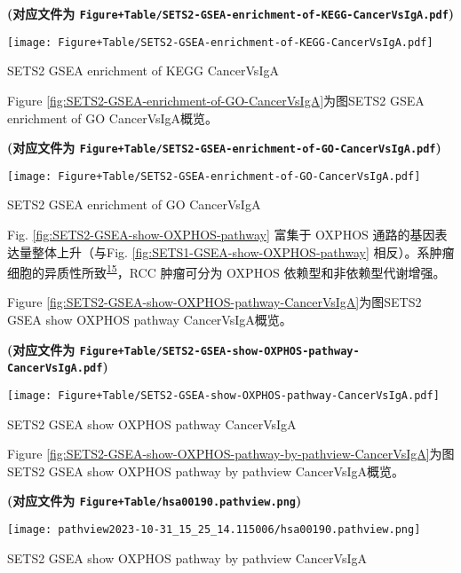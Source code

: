 \documentclass[
]{article}
\begin{document}
\textbf{(对应文件为 \texttt{Figure+Table/SETS2-GSEA-enrichment-of-KEGG-CancerVsIgA.pdf})}

\def\@captype{figure}
\begin{center}
\texttt{[image: Figure+Table/SETS2-GSEA-enrichment-of-KEGG-CancerVsIgA.pdf]}
\caption{SETS2 GSEA enrichment of KEGG CancerVsIgA}\label{fig:SETS2-GSEA-enrichment-of-KEGG-CancerVsIgA}
\end{center}

Figure \ref{fig:SETS2-GSEA-enrichment-of-GO-CancerVsIgA}为图SETS2 GSEA enrichment of GO CancerVsIgA概览。

\textbf{(对应文件为 \texttt{Figure+Table/SETS2-GSEA-enrichment-of-GO-CancerVsIgA.pdf})}

\def\@captype{figure}
\begin{center}
\texttt{[image: Figure+Table/SETS2-GSEA-enrichment-of-GO-CancerVsIgA.pdf]}
\caption{SETS2 GSEA enrichment of GO CancerVsIgA}\label{fig:SETS2-GSEA-enrichment-of-GO-CancerVsIgA}
\end{center}

Fig. \ref{fig:SETS2-GSEA-show-OXPHOS-pathway} 富集于 OXPHOS 通路的基因表达量整体上升（与Fig. \ref{fig:SETS1-GSEA-show-OXPHOS-pathway} 相反）。系肿瘤细胞的异质性所致\textsuperscript{\protect\hyperlink{ref-HallmarksOfCaSancho2016}{15}}，RCC 肿瘤可分为 OXPHOS 依赖型和非依赖型代谢增强。

Figure \ref{fig:SETS2-GSEA-show-OXPHOS-pathway-CancerVsIgA}为图SETS2 GSEA show OXPHOS pathway CancerVsIgA概览。

\textbf{(对应文件为 \texttt{Figure+Table/SETS2-GSEA-show-OXPHOS-pathway-CancerVsIgA.pdf})}

\def\@captype{figure}
\begin{center}
\texttt{[image: Figure+Table/SETS2-GSEA-show-OXPHOS-pathway-CancerVsIgA.pdf]}
\caption{SETS2 GSEA show OXPHOS pathway CancerVsIgA}\label{fig:SETS2-GSEA-show-OXPHOS-pathway-CancerVsIgA}
\end{center}

Figure \ref{fig:SETS2-GSEA-show-OXPHOS-pathway-by-pathview-CancerVsIgA}为图SETS2 GSEA show OXPHOS pathway by pathview CancerVsIgA概览。

\textbf{(对应文件为 \texttt{Figure+Table/hsa00190.pathview.png})}

\def\@captype{figure}
\begin{center}
\texttt{[image: pathview2023-10-31\_15\_25\_14.115006/hsa00190.pathview.png]}
\caption{SETS2 GSEA show OXPHOS pathway by pathview CancerVsIgA}\label{fig:SETS2-GSEA-show-OXPHOS-pathway-by-pathview-CancerVsIgA}
\end{center}
\end{document}
